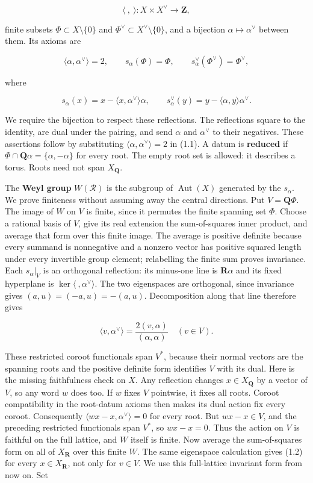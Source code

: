 \documentclass[11pt,a4paper,openany]{report}
\begin{document}
\[
\langle\ ,\ \rangle:X\times X^\vee\longrightarrow\mathbf Z,
\]

finite subsets \(\Phi\subset X\setminus\{0\}\) and \(\Phi^\vee\subset X^\vee\setminus\{0\}\), and a bijection \(\alpha\mapsto\alpha^\vee\) between them. Its axioms are

\[
\langle\alpha,\alpha^\vee\rangle=2,
\qquad
s_\alpha(\Phi)=\Phi,
\qquad
s_\alpha^\vee(\Phi^\vee)=\Phi^\vee,
\]

where

\[
s_\alpha(x)=x-\langle x,\alpha^\vee\rangle\alpha,
\qquad
s_\alpha^\vee(y)=y-\langle\alpha,y\rangle\alpha^\vee.
\tag{1.1}
\]

We require the bijection to respect these reflections. The reflections square to the identity, are dual under the pairing, and send \(\alpha\) and \(\alpha^\vee\) to their negatives. These assertions follow by substituting \(\langle\alpha,\alpha^\vee\rangle=2\) in (1.1). A datum is \textbf{reduced} if \(\Phi\cap\mathbf Q\alpha=\{\alpha,-\alpha\}\) for every root. The empty root set is allowed: it describes a torus. Roots need not span \(X_\mathbf Q\).

The \textbf{Weyl group} \(W(\mathcal R)\) is the subgroup of \(\operatorname{Aut}(X)\) generated by the \(s_\alpha\). We prove finiteness without assuming away the central directions. Put \(V=\mathbf Q\Phi\). The image of \(W\) on \(V\) is finite, since it permutes the finite spanning set \(\Phi\). Choose a rational basis of \(V\), give its real extension the sum-of-squares inner product, and average that form over this finite image. The average is positive definite because every summand is nonnegative and a nonzero vector has positive squared length under every invertible group element; relabelling the finite sum proves invariance. Each \(s_\alpha|_V\) is an orthogonal reflection: its minus-one line is \(\mathbf R\alpha\) and its fixed hyperplane is \(\ker\langle\ ,\alpha^\vee\rangle\). The two eigenspaces are orthogonal, since invariance gives \((a,u)=(-a,u)=-(a,u)\). Decomposition along that line therefore gives

\[
\langle v,\alpha^\vee\rangle
=\frac{2(v,\alpha)}{(\alpha,\alpha)}\quad(v\in V).
\tag{1.2}
\]

These restricted coroot functionals span \(V^*\), because their normal vectors are the spanning roots and the positive definite form identifies \(V\) with its dual. Here is the missing faithfulness check on \(X\). Any reflection changes \(x\in X_\mathbf Q\) by a vector of \(V\), so any word \(w\) does too. If \(w\) fixes \(V\) pointwise, it fixes all roots. Coroot compatibility in the root-datum axioms then makes its dual action fix every coroot. Consequently \(\langle wx-x,\alpha^\vee\rangle=0\) for every root. But \(wx-x\in V\), and the preceding restricted functionals span \(V^*\), so \(wx-x=0\). Thus the action on \(V\) is faithful on the full lattice, and \(W\) itself is finite. Now average the sum-of-squares form on all of \(X_\mathbf R\) over this finite \(W\). The same eigenspace calculation gives (1.2) for every \(x\in X_\mathbf R\), not only for \(v\in V\). We use this full-lattice invariant form from now on. Set
\end{document}

